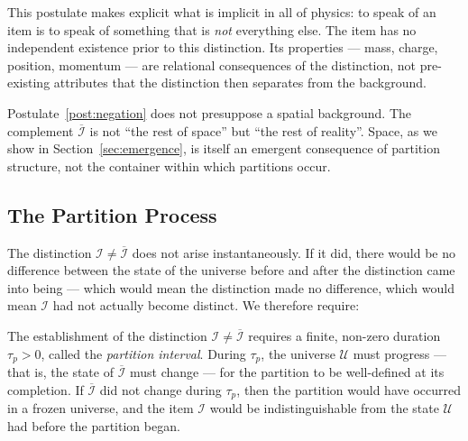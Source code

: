 This postulate makes explicit what is implicit in all of physics: to speak of an
item is to speak of something that is \emph{not} everything else. The item has no
independent existence prior to this distinction. Its properties --- mass, charge,
position, momentum --- are relational consequences of the distinction, not
pre-existing attributes that the distinction then separates from the background.

\begin{remark}
Postulate~\ref{post:negation} does not presuppose a spatial background. The
complement $\overline{\mathcal{I}}$ is not ``the rest of space'' but ``the rest
of reality''. Space, as we show in Section~\ref{sec:emergence}, is itself an
emergent consequence of partition structure, not the container within which
partitions occur.
\end{remark}

\subsection{The Partition Process}
\label{subsec:partition_process}

The distinction $\mathcal{I} \neq \overline{\mathcal{I}}$ does not arise
instantaneously. If it did, there would be no difference between the state of
the universe before and after the distinction came into being --- which would
mean the distinction made no difference, which would mean $\mathcal{I}$ had not
actually become distinct. We therefore require:

\begin{postulate}
\label{post:duration}
The establishment of the distinction $\mathcal{I} \neq \overline{\mathcal{I}}$
requires a finite, non-zero duration $\tau_p > 0$, called the
\emph{partition interval}. During $\tau_p$, the universe $\mathcal{U}$ must
progress --- that is, the state of $\overline{\mathcal{I}}$ must change --- for
the partition to be well-defined at its completion. If $\overline{\mathcal{I}}$
did not change during $\tau_p$, then the partition would have occurred in a
frozen universe, and the item $\mathcal{I}$ would be indistinguishable from the
state $\mathcal{U}$ had before the partition began.
\end{postulate}

